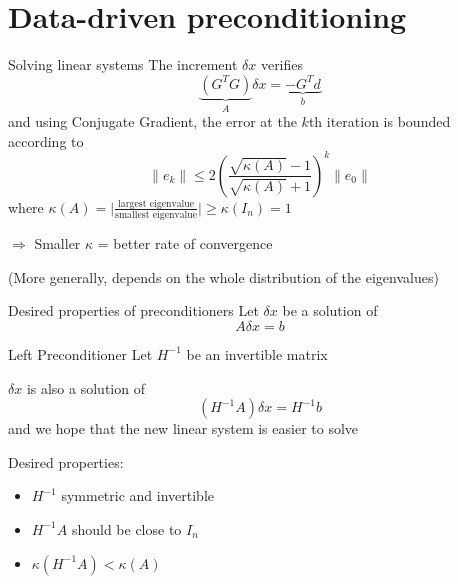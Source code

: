 \documentclass[10pt,aspectratio=169]{beamer}
\begin{document}
\section{Data-driven preconditioning}
\begin{frame}{Solving linear systems}
The increment $\delta x$ verifies
\begin{equation}
    \underbrace{(G^TG)}_{A}\delta x = \underbrace{-G^Td}_{b}
\end{equation}
and using Conjugate Gradient, the error at the $k$th iteration is bounded according to
\begin{equation}
    \|e_k\| \leq 2\left(\frac{\sqrt{\kappa(A)} - 1}{\sqrt{\kappa(A)} + 1}\right)^k \|e_0\|
\end{equation}
where
 $\kappa(A) = \lvert\frac{\text{largest eigenvalue}}{\text{smallest eigenvalue}}\rvert \geq \kappa(I_n) = 1$
 
 
$\Rightarrow$ \alert{Smaller $\kappa$} = \alert{better} rate of convergence

(More generally, depends on the whole distribution of the eigenvalues)

\cite{haben_conditioning_2011,gurol_b_2014,tabeart_new_2021,robert_reduced-order_2006}
\end{frame}
\begin{frame}{Desired properties of preconditioners}
Let $\delta x$ be a solution of
\begin{equation}
    A \delta x = b
\end{equation}
\begin{block}{Left Preconditioner}
    Let $H^{-1}$ be an invertible matrix
    
$\delta x$ is also a solution of
    \begin{equation}
        (H^{-1}A) \delta x= H^{-1}b
    \end{equation}
    and we hope that the new linear system is easier to solve
\end{block}

Desired properties:
\begin{itemize}
    \item  $H^{-1}$ symmetric and invertible
    \item $H^{-1}A$ should be close to $I_n$
    \item $\kappa(H^{-1}A) < \kappa(A)$
\end{itemize}
    
\end{frame}
\end{document}
